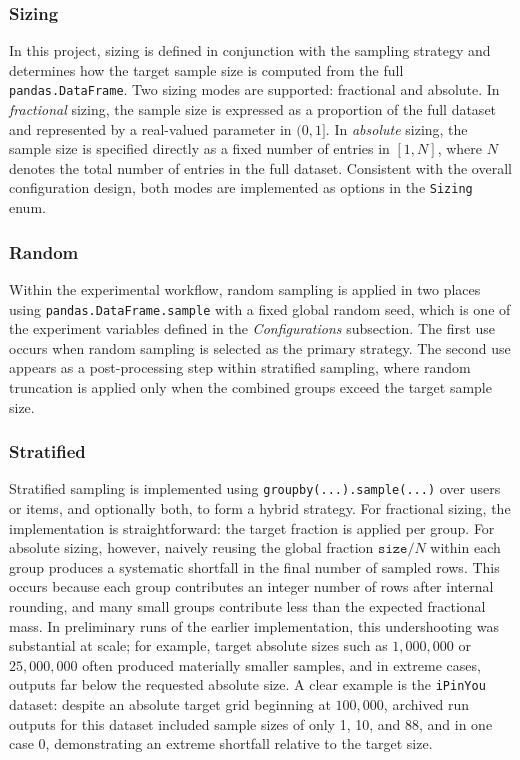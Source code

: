 \documentclass[12pt,a4paper]{article}
\begin{document}
\subsubsection{Sizing}
In this project, sizing is defined in conjunction with the sampling strategy and determines how the target sample size is computed from the full \texttt{pandas.DataFrame}. Two sizing modes are supported: fractional and absolute. In \emph{fractional} sizing, the sample size is expressed as a proportion of the full dataset and represented by a real-valued parameter in $(0,1]$. In \emph{absolute} sizing, the sample size is specified directly as a fixed number of entries in $[1, N]$, where $N$ denotes the total number of entries in the full dataset. Consistent with the overall configuration design, both modes are implemented as options in the \texttt{Sizing} enum.

\subsubsection{Random}
Within the experimental workflow, random sampling is applied in two places using \texttt{pandas.DataFrame.sample} with a fixed global random seed, which is one of the experiment variables defined in the \emph{Configurations} subsection. The first use occurs when random sampling is selected as the primary strategy. The second use appears as a post-processing step within stratified sampling, where random truncation is applied only when the combined groups exceed the target sample size.

\subsubsection{Stratified}
Stratified sampling is implemented using \texttt{groupby(...).sample(...)} over users or items, and optionally both, to form a hybrid strategy. For fractional sizing, the implementation is straightforward: the target fraction is applied per group. For absolute sizing, however, naively reusing the global fraction $\texttt{size}/N$ within each group produces a systematic shortfall in the final number of sampled rows. This occurs because each group contributes an integer number of rows after internal rounding, and many small groups contribute less than the expected fractional mass. In preliminary runs of the earlier implementation, this undershooting was substantial at scale; for example, target absolute sizes such as $1{,}000{,}000$ or $25{,}000{,}000$ often produced materially smaller samples, and in extreme cases, outputs far below the requested absolute size. A clear example is the \texttt{iPinYou} dataset: despite an absolute target grid beginning at $100{,}000$, archived run outputs for this dataset included sample sizes of only 1, 10, and 88, and in one case 0, demonstrating an extreme shortfall relative to the target size.
\end{document}
